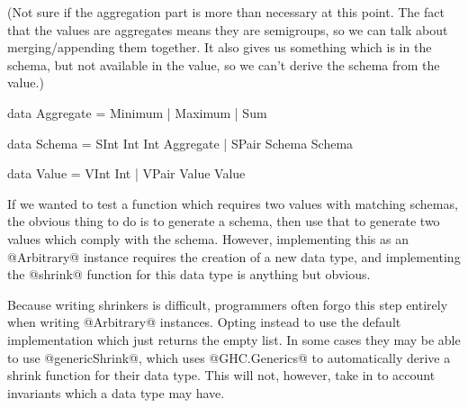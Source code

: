 (Not sure if the aggregation part is more than necessary at this point. The fact that the values are aggregates means they are semigroups, so we can talk about merging/appending them together. It also gives us something which is in the schema, but not available in the value, so we can't derive the schema from the value.)

\begin{code}
  data Aggregate =
      Minimum
    | Maximum
    | Sum

  data Schema =
      SInt Int Int Aggregate
    | SPair Schema Schema

  data Value =
      VInt Int
    | VPair Value Value
\end{code}

If we wanted to test a function which requires two values with matching schemas, the obvious thing to do is to generate a schema, then use that to generate two values which comply with the schema. However, implementing this as an @Arbitrary@ instance requires the creation of a new data type, and implementing the @shrink@ function for this data type is anything but obvious.


Because writing shrinkers is difficult, programmers often forgo this step entirely when writing @Arbitrary@ instances. Opting instead to use the default implementation which just returns the empty list. In some cases they may be able to use @genericShrink@, which uses @GHC.Generics@ to automatically derive a shrink function for their data type. This will not, however, take in to account invariants which a data type may have. 

